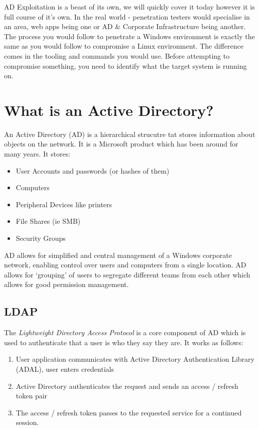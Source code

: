 
AD Exploitation is a beast of its own, we will quickly cover it today however it is full course of it's own. In the real world - penetration testers would specialise in an area, web apps being one or AD \& Corporate Infrastructure being another.\\

The process you would follow to penetrate a Windows environment is exactly the same as you would follow to compromise a Linux environment. The difference comes in the tooling and commands you would use. Before attempting to compromise something, you need to identify what the target system is running on. 

\section{What is an Active Directory?}
An Active Directory (AD) is a hierarchical strucutre tat stores information about objects on the network. It is a Microsoft product which has been around for many years. It stores:
\begin{itemize}
    \item User Accounts and passwords (or hashes of them)
    \item Computers
    \item Peripheral Devices like printers
    \item File Shares (ie SMB)
    \item Security Groups
\end{itemize}

AD allows for simplified and central management of a Windows corporate network, enabling control over users and computers from a single location. AD allows for `grouping' of users to segregate different teams from each other which allows for good permission management.

\subsection{LDAP}
The \textit{Lightweight Directory Access Protocol} is a core component of AD which is used to authenticate that a user is who they say they are. It works as follows:
\begin{enumerate}
    \item User application communicates with Active Directory Authentication Library (ADAL), user enters credentials
    \item Active Directory authenticates the request and sends an access / refresh token pair
    \item The access / refresh token passes to the requested service for a continued session.
\end{enumerate}

